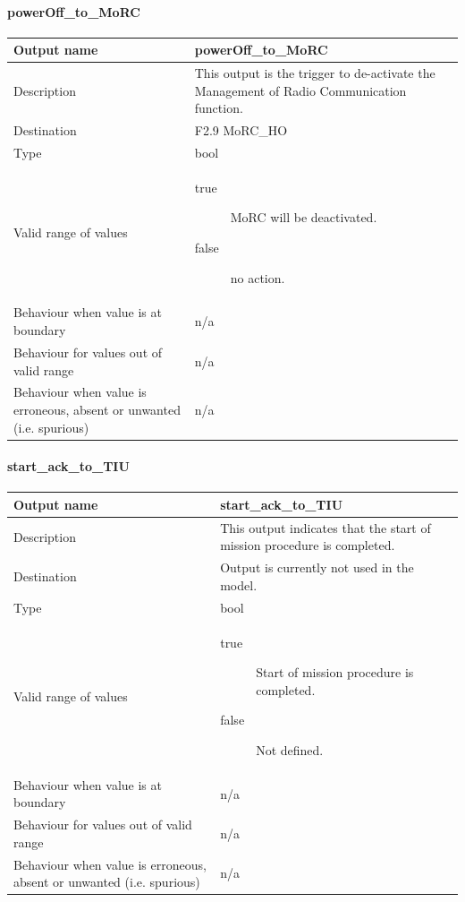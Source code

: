 \paragraph{powerOff\_to\_MoRC}

\begin{longtable}{p{}p{}}
\toprule
Output name				& powerOff\_to\_MoRC \\
\midrule
Description				& This output is the trigger to de-activate the Management of Radio Communication function. \\
\midrule
Destination				& F2.9 MoRC\_HO \\ 
\midrule
Type					& bool \\
\midrule
Valid range of values	& \begin{description}
\item[true]MoRC will be deactivated. 
\item[false]no action.
\end{description} \\
\midrule
Behaviour when value is at boundary	& n/a \\
\midrule
Behaviour for values out of valid range	& n/a \\
\midrule
Behaviour when value is erroneous, absent or unwanted (i.e. spurious) & n/a \\
\bottomrule
\end{longtable}

\paragraph{start\_ack\_to\_TIU}

\begin{longtable}{p{}p{}}
\toprule
Output name				& start\_ack\_to\_TIU \\
\midrule
Description				& This output indicates that the start of mission procedure is completed. \\
\midrule
Destination				& Output is currently not used in the model. \\ 
\midrule
Type					& bool \\
\midrule
Valid range of values	&  \begin{description}
\item[true]Start of mission procedure is completed.
\item[false]Not defined. 
\end{description} \\
\midrule
Behaviour when value is at boundary	& n/a \\
\midrule
Behaviour for values out of valid range	& n/a \\
\midrule
Behaviour when value is erroneous, absent or unwanted (i.e. spurious) & n/a \\
\bottomrule
\end{longtable}


